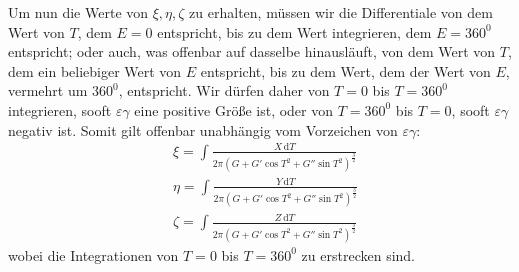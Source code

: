 Um nun die Werte von $\xi,\eta,\zeta$ zu erhalten, müssen wir die Differentiale von dem Wert von $T$, dem $E=0$ entspricht, bis zu dem Wert integrieren, dem $E=360^0$ entspricht; oder auch, was offenbar auf dasselbe hinausläuft, von dem Wert von $T$, dem ein beliebiger Wert von $E$ entspricht, bis zu dem Wert, dem der Wert von $E$, vermehrt um $360^0$, entspricht. Wir dürfen daher von $T=0$ bis $T=360^0$ integrieren, sooft $\varepsilon\gamma$ eine positive Größe ist, oder von $T=360^0$ bis $T=0$, sooft $\varepsilon\gamma$ negativ ist. Somit gilt offenbar unabhängig vom Vorzeichen von $\varepsilon\gamma$:
\[
\begin{aligned}
&\xi=\int\frac{X\,\mathrm dT}{2\pi(G+G'\cos T^2+G''\sin T^2)^{\frac32}}\\[8pt]
&\eta=\int\frac{Y\,\mathrm dT}{2\pi(G+G'\cos T^2+G''\sin T^2)^{\frac32}}\\[8pt]
&\zeta=\int\frac{Z\,\mathrm dT}{2\pi(G+G'\cos T^2+G''\sin T^2)^{\frac32}}
\end{aligned}
\]
wobei die Integrationen von $T=0$ bis $T=360^0$ zu erstrecken sind.

